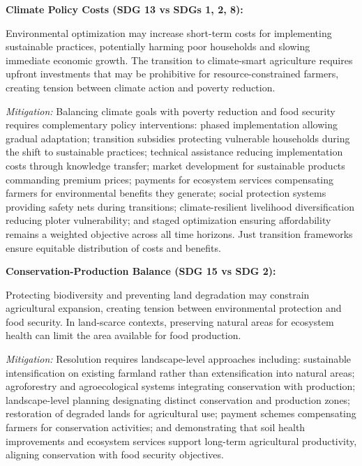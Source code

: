 \documentclass{oqireport}
\begin{document}
\textbf{Climate Policy Costs (SDG 13 vs SDGs 1, 2, 8):}

Environmental optimization may increase short-term costs for implementing sustainable practices, potentially harming poor households and slowing immediate economic growth. The transition to climate-smart agriculture requires upfront investments that may be prohibitive for resource-constrained farmers, creating tension between climate action and poverty reduction.

\textit{Mitigation:} Balancing climate goals with poverty reduction and food security requires complementary policy interventions: phased implementation allowing gradual adaptation; transition subsidies protecting vulnerable households during the shift to sustainable practices; technical assistance reducing implementation costs through knowledge transfer; market development for sustainable products commanding premium prices; payments for ecosystem services compensating farmers for environmental benefits they generate; social protection systems providing safety nets during transitions; climate-resilient livelihood diversification reducing ploter vulnerability; and staged optimization ensuring affordability remains a weighted objective across all time horizons. Just transition frameworks ensure equitable distribution of costs and benefits.

\textbf{Conservation-Production Balance (SDG 15 vs SDG 2):}

Protecting biodiversity and preventing land degradation may constrain agricultural expansion, creating tension between environmental protection and food security. In land-scarce contexts, preserving natural areas for ecosystem health can limit the area available for food production.

\textit{Mitigation:} Resolution requires landscape-level approaches including: sustainable intensification on existing farmland rather than extensification into natural areas; agroforestry and agroecological systems integrating conservation with production; landscape-level planning designating distinct conservation and production zones; restoration of degraded lands for agricultural use; payment schemes compensating farmers for conservation activities; and demonstrating that soil health improvements and ecosystem services support long-term agricultural productivity, aligning conservation with food security objectives.

\end{document}
